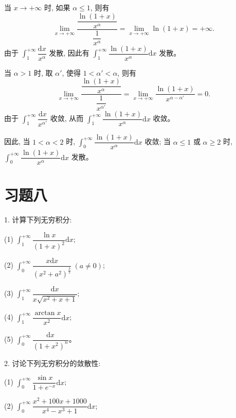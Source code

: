 \documentclass[UTF8,12pt,a4paper,fontset=fandol]{ctexart}
\begin{document}
当 $x\to+\infty$ 时, 如果 $\alpha\leq1$, 则有
\[
  \lim_{x\to+\infty}
  \frac{\dfrac{\ln(1+x)}{x^\alpha}}{\dfrac1{x^\alpha}}
  =
  \lim_{x\to+\infty}\ln(1+x)=+\infty.
\]
由于 $\int_1^{+\infty}\dfrac{\mathrm dx}{x^\alpha}$ 发散, 因此有 $\int_1^{+\infty}\dfrac{\ln(1+x)}{x^\alpha}\mathrm dx$ 发散。

当 $\alpha>1$ 时, 取 $\alpha'$, 使得 $1<\alpha'<\alpha$, 则有
\[
  \lim_{x\to+\infty}
  \frac{\dfrac{\ln(1+x)}{x^\alpha}}{\dfrac1{x^{\alpha'}}}
  =
  \lim_{x\to+\infty}\frac{\ln(1+x)}{x^{\alpha-\alpha'}}=0.
\]
由于 $\int_1^{+\infty}\dfrac{\mathrm dx}{x^{\alpha'}}$ 收敛, 从而 $\int_1^{+\infty}\dfrac{\ln(1+x)}{x^\alpha}\mathrm dx$ 收敛。

因此, 当 $1<\alpha<2$ 时, $\int_0^{+\infty}\dfrac{\ln(1+x)}{x^\alpha}\mathrm dx$ 收敛; 当 $\alpha\leq1$ 或 $\alpha\geq2$ 时, $\int_0^{+\infty}\dfrac{\ln(1+x)}{x^\alpha}\mathrm dx$ 发散。

\section*{习题八}

1. 计算下列无穷积分:

(1) $\int_1^{+\infty}\dfrac{\ln x}{(1+x)^2}\mathrm dx$;

(2) $\int_0^{+\infty}\dfrac{x\mathrm dx}{(x^2+a^2)^{\frac32}}\ (a\ne0)$;

(3) $\int_1^{+\infty}\dfrac{\mathrm dx}{x\sqrt{x^2+x+1}}$;

(4) $\int_1^{+\infty}\dfrac{\arctan x}{x^2}\mathrm dx$;

(5) $\int_0^{+\infty}\dfrac{\mathrm dx}{(1+x^2)^n}$。

2. 讨论下列无穷积分的敛散性:

(1) $\int_0^{+\infty}\dfrac{\sin x}{1+e^{-x}}\mathrm dx$;

(2) $\int_0^{+\infty}\dfrac{x^2+100x+1000}{x^4-x^3+1}\mathrm dx$;
\end{document}
